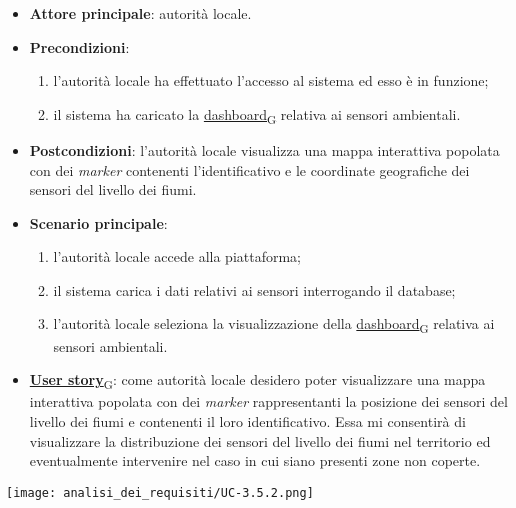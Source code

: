 \newpage
{}
\begin{itemize}
	\item \textbf{Attore principale}: autorità locale.
	\item \textbf{Precondizioni}:
	      \begin{enumerate}
		      \item l'autorità locale ha effettuato l'accesso al sistema ed esso è in funzione;
		      \item il sistema ha caricato la \href{https://7last.github.io/docs/pb/documentazione-interna/glossario\#dashboard}{dashboard\textsubscript{G}} relativa ai sensori ambientali.
	      \end{enumerate}
	\item \textbf{Postcondizioni}: l'autorità locale visualizza una mappa interattiva popolata con dei \textit{marker} contenenti l'identificativo e le coordinate geografiche dei sensori del livello dei fiumi.
	\item \textbf{Scenario principale}:
	      \begin{enumerate}
		      \item l'autorità locale accede alla piattaforma;
		      \item il sistema carica i dati relativi ai sensori interrogando il database;
		      \item l'autorità locale seleziona la visualizzazione della \href{https://7last.github.io/docs/pb/documentazione-interna/glossario\#dashboard}{dashboard\textsubscript{G}} relativa ai sensori ambientali.
	      \end{enumerate}
	\item \href{https://7last.github.io/docs/pb/documentazione-interna/glossario\#user-story}{\textbf{User story}\textsubscript{G}}:
	      come autorità locale desidero poter visualizzare una mappa interattiva popolata con dei \textit{marker} rappresentanti la posizione dei sensori del livello dei fiumi
	      e contenenti il loro identificativo. Essa mi consentirà di visualizzare la distribuzione dei sensori del livello dei fiumi nel territorio ed eventualmente intervenire nel caso in cui siano presenti zone non coperte.
\end{itemize}
\begin{center}
	\texttt{[image: analisi\_dei\_requisiti/UC-3.5.2.png]}
\end{center}


